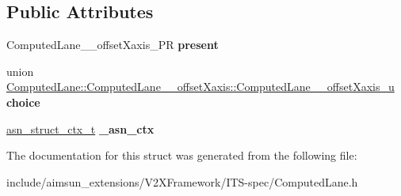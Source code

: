 \subsection*{Public Attributes}
\begin{DoxyCompactItemize}
\item 
Computed\+Lane\+\_\+\+\_\+offset\+Xaxis\+\_\+\+PR {\bfseries present}\hypertarget{structComputedLane_1_1ComputedLane____offsetXaxis_aae3fe9ba4c706d959427af90ff889f87}{}\label{structComputedLane_1_1ComputedLane____offsetXaxis_aae3fe9ba4c706d959427af90ff889f87}

\item 
union \hyperlink{unionComputedLane_1_1ComputedLane____offsetXaxis_1_1ComputedLane____offsetXaxis__u}{Computed\+Lane\+::\+Computed\+Lane\+\_\+\+\_\+offset\+Xaxis\+::\+Computed\+Lane\+\_\+\+\_\+offset\+Xaxis\+\_\+u} {\bfseries choice}\hypertarget{structComputedLane_1_1ComputedLane____offsetXaxis_aec23a4d80994e557425bff3489c83122}{}\label{structComputedLane_1_1ComputedLane____offsetXaxis_aec23a4d80994e557425bff3489c83122}

\item 
\hyperlink{structasn__struct__ctx__s}{asn\+\_\+struct\+\_\+ctx\+\_\+t} {\bfseries \+\_\+asn\+\_\+ctx}\hypertarget{structComputedLane_1_1ComputedLane____offsetXaxis_adebebb248b7c19965d3d89992f525c2a}{}\label{structComputedLane_1_1ComputedLane____offsetXaxis_adebebb248b7c19965d3d89992f525c2a}

\end{DoxyCompactItemize}


The documentation for this struct was generated from the following file\+:\begin{DoxyCompactItemize}
\item 
include/aimsun\+\_\+extensions/\+V2\+X\+Framework/\+I\+T\+S-\/spec/Computed\+Lane.\+h\end{DoxyCompactItemize}
